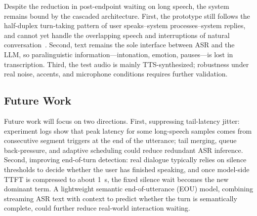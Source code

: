 \documentclass[a4paper,11pt]{article}
\begin{document}
Despite the reduction in post-endpoint waiting on long speech, the system remains bound by the cascaded architecture. First, the prototype still follows the half-duplex turn-taking pattern of user speaks--system processes--system replies, and cannot yet handle the overlapping speech and interruptions of natural conversation~\cite{ref22}. Second, text remains the sole interface between ASR and the LLM, so paralinguistic information---intonation, emotion, pauses---is lost in transcription. Third, the test audio is mainly TTS-synthesized; robustness under real noise, accents, and microphone conditions requires further validation.

\subsection{Future Work}

Future work will focus on two directions. First, suppressing tail-latency jitter: experiment logs show that peak latency for some long-speech samples comes from consecutive segment triggers at the end of the utterance; tail merging, queue back-pressure, and adaptive scheduling could reduce redundant ASR inference. Second, improving end-of-turn detection: real dialogue typically relies on silence thresholds to decide whether the user has finished speaking, and once model-side TTFT is compressed to about 1~s, the fixed silence wait becomes the new dominant term. A lightweight semantic end-of-utterance (EOU) model, combining streaming ASR text with context to predict whether the turn is semantically complete, could further reduce real-world interaction waiting.
\end{document}

